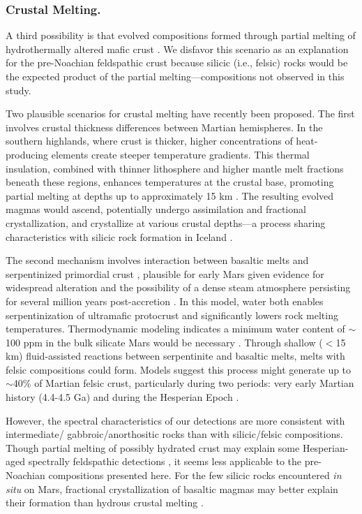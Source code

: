 \documentclass[12pt]{article}
\begin{document}
\subsubsection*{Crustal Melting.} 

A third possibility is that evolved compositions formed through partial melting of hydrothermally altered mafic crust \citep{BonnetGibet2025, Bernadet2025}. We disfavor this scenario as an explanation for the pre-Noachian feldspathic crust because silicic (i.e., felsic) rocks would be the expected product of the partial melting---compositions not observed in this study.

Two plausible scenarios for crustal melting have recently been proposed. The first involves crustal thickness differences between Martian hemispheres. In the southern highlands, where crust is thicker, higher concentrations of heat-producing elements create steeper temperature gradients. This thermal insulation, combined with thinner lithosphere and higher mantle melt fractions beneath these regions, enhances temperatures at the crustal base, promoting partial melting at depths up to approximately 15 km \citep{BonnetGibet2022, BonnetGibet2025}. The resulting evolved magmas would ascend, potentially undergo assimilation and fractional crystallization, and crystallize at various crustal depths---a process sharing characteristics with silicic rock formation in Iceland \citep{Jonasson2007, Martin2007, Martin2010}.

The second mechanism involves interaction between basaltic melts and serpentinized primordial crust \citep{Bernadet2025}, plausible for early Mars given evidence for widespread alteration \citep{Bibring2006, Bishop2008, Ehlmann2009, Ehlmann2014, Wordsworth2017, Viviano2023, Carter2023, Royer2024} and the possibility of a dense steam atmosphere persisting for several million years post-accretion \citep{Abe2011, Scherf2020}. In this model, water both enables serpentinization of ultramafic protocrust and significantly lowers rock melting temperatures. Thermodynamic modeling indicates a minimum water content of $\sim$100 ppm in the bulk silicate Mars would be necessary \citep{Bernadet2025}. Through shallow ($<$15 km) fluid-assisted reactions between serpentinite and basaltic melts, melts with felsic compositions could form. Models suggest this process might generate up to $\sim$40\% of Martian felsic crust, particularly during two periods: very early Martian history (4.4-4.5 Ga) and during the Hesperian Epoch \citep{Bernadet2025}.

However, the spectral characteristics of our detections are more consistent with intermediate/ gabbroic/anorthositic rocks than with silicic/felsic compositions. Though partial melting of possibly hydrated crust may explain some Hesperian-aged spectrally feldspathic detections \citep{Farrand2021, Rogers2022, Michalski2023}, it seems less applicable to the pre-Noachian compositions presented here. For the few silicic rocks encountered \textit{in situ} on Mars, fractional crystallization of basaltic magmas may better explain their formation than hydrous crustal melting \citep{Christensen2005, Udry2018,Ostwald2022}.
\end{document}
